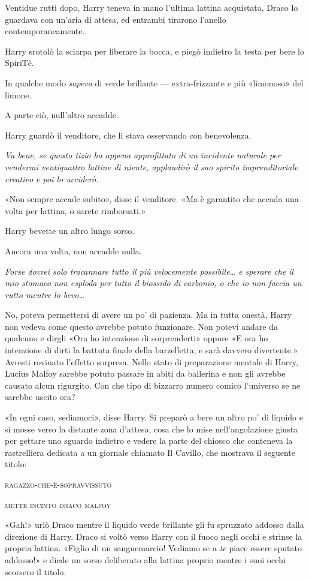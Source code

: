Ventidue rutti dopo, Harry teneva in mano l’ultima lattina acquistata, Draco lo guardava con un’aria di attesa, ed entrambi tirarono l’anello contemporaneamente.

Harry srotolò la sciarpa per liberare la bocca, e piegò indietro la testa per bere lo SpiriTè.

In qualche modo \textit{sapeva} di verde brillante — extra-frizzante e più «limonoso» del limone.

A parte ciò, null’altro accadde.

Harry guardò il venditore, che li stava osservando con benevolenza.

\textit{Va bene, se questo tizio ha appena approfittato di un incidente naturale per vendermi ventiquattro lattine di niente, applaudirò il suo spirito imprenditoriale creativo e poi lo ucciderò.}

«Non sempre accade subito», disse il venditore. «Ma è garantito che accada una volta per lattina, o sarete rimborsati.»

Harry bevette un altro lungo sorso.

Ancora una volta, non accadde nulla.

\textit{Forse dovrei solo tracannare tutto il più velocemente possibile… e sperare che il mio stomaco non esploda per tutto il biossido di carbonio, o che io non faccia un rutto mentre lo bevo…}

No, poteva permettersi di avere un po’ di pazienza. Ma in tutta onestà, Harry non vedeva come questo avrebbe potuto funzionare. Non potevi andare da qualcuno e dirgli «Ora ho intenzione di sorprenderti» oppure «E ora ho intenzione di dirti la battuta finale della barzelletta, e sarà davvero divertente.» Avresti rovinato l’effetto sorpresa. Nello stato di preparazione mentale di Harry, Lucius Malfoy sarebbe potuto passare in abiti da ballerina e non gli avrebbe causato alcun rigurgito. Con che tipo di bizzarro numero comico l’universo se ne sarebbe uscito ora?

«In ogni caso, sediamoci», disse Harry. Si preparò a bere un altro po’ di liquido e si mosse verso la distante zona d’attesa, cosa che lo mise nell’angolazione giusta per gettare uno sguardo indietro e vedere la parte del chiosco che conteneva la rastrelliera dedicata a un giornale chiamato Il Cavillo, che mostrava il seguente titolo:

\textsc{ragazzo-che-è-sopravvissuto}

\textsc{mette incinto draco malfoy}

«Gah!» urlò Draco mentre il liquido verde brillante gli fu spruzzato addosso dalla direzione di Harry. Draco si voltò verso Harry con il fuoco negli occhi e strinse la propria lattina. «Figlio di un sanguemarcio! Vediamo se a \textit{te} piace essere sputato addosso!» e diede un sorso deliberato alla lattina proprio mentre i suoi occhi scorsero il titolo.

